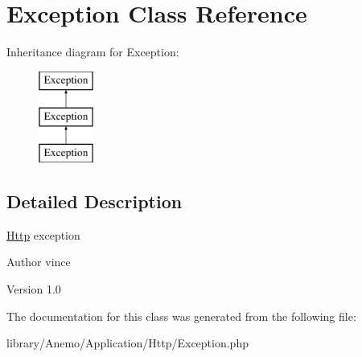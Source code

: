 \hypertarget{class_anemo_1_1_application_1_1_http_1_1_exception}{
\section{Exception Class Reference}
\label{class_anemo_1_1_application_1_1_http_1_1_exception}
}
Inheritance diagram for Exception:\begin{figure}[H]
\begin{center}
\leavevmode
\includegraphics[height=3.000000cm]{class_anemo_1_1_application_1_1_http_1_1_exception}
\end{center}
\end{figure}


\subsection{Detailed Description}
\hyperlink{namespace_anemo_1_1_application_1_1_http}{Http} exception \begin{DoxyAuthor}{Author}
vince 
\end{DoxyAuthor}
\begin{DoxyVersion}{Version}
1.0 
\end{DoxyVersion}


The documentation for this class was generated from the following file:\begin{DoxyCompactItemize}
\item 
library/Anemo/Application/Http/Exception.php\end{DoxyCompactItemize}
